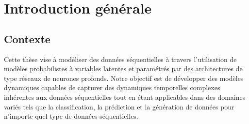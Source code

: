 \chapter*{Introduction générale}




\vspace{.65cm}
\section*{Contexte}
Cette thèse vise à modéliser des données séquentielles à travers l'utilisation
de modèles probabilistes à variables latentes et paramétrés par des
architectures de type réseaux de neurones profonds. Notre objectif est de
développer des modèles dynamiques capables de capturer des dynamiques
temporelles complexes inhérentes aux données séquentielles tout en étant
applicables dans des domaines variés tels que la classification, la prédiction
et la génération de données pour n'importe quel type de données séquentielles.\\


